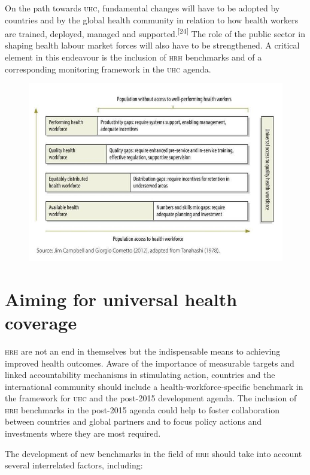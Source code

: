 \documentclass{article}
\begin{document}
On the path towards \textsc{uhc}, fundamental changes will have to be adopted by
countries and by the
global health community in relation to how health workers are trained, deployed,
managed and
supported.\textsuperscript{[}\textsuperscript{24}\textsuperscript{]}
The role of the public sector in
shaping health labour market forces will also have to be strengthened. A
critical element in this
endeavour is the inclusion of \textsc{hrh} benchmarks and of a corresponding monitoring
framework in the \textsc{uhc}
agenda.

\begin{figure}
\includegraphics[width=\textwidth]{0042-9686-bwho-91-11-881-F1}
\caption{}\label{fig:F1}
\end{figure}

\section{Aiming for universal health coverage}

\textsc{hrh} are not an end in themselves but the indispensable means to achieving
improved health
outcomes. Aware of the importance of measurable targets and linked
accountability mechanisms in
stimulating action, countries and the international community should include a
health-workforce-specific benchmark in the framework for \textsc{uhc} and the post-2015
development agenda.
The inclusion of \textsc{hrh} benchmarks in the post-2015 agenda could help to foster
collaboration between
countries and global partners and to focus policy actions and investments where
they are most
required.

The development of new benchmarks in the field of \textsc{hrh} should take into account
several
interrelated factors, including:
\end{document}
